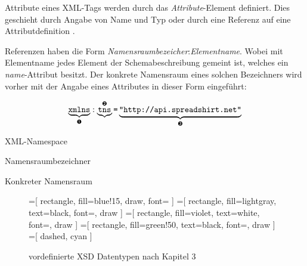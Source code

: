 Attribute eines \gls{XML}-Tags werden durch das \emph{Attribute}-Element definiert. Dies geschieht durch Angabe von Name und Typ  oder durch eine Referenz auf eine Attributdefinition .

Referenzen haben die Form \emph{Namensraumbezeicher}:\emph{Elementname}. Wobei mit Elementname jedes Element der Schemabeschreibung gemeint ist, welches ein \emph{name}-Attribut besitzt. Der konkrete Namensraum eines solchen Bezeichners wird vorher mit der Angabe eines Attributes in dieser Form eingeführt:

\[  
    \underbrace{\text{\texttt{xmlns}}}_{\text{\ding{202}}}
    :
    \underbrace{\text{\texttt{tns}}}^{\text{\ding{203}}}
    \texttt{=}
    \underbrace{
        \texttt{"http://api.spreadshirt.net"}
    }_{\text{\ding{204}}}
\]

\begin{compactitem}
    \item[\ding{202}] \gls{XML}-Namespace
    \item[\ding{203}] Namensraumbezeichner
    \item[\ding{204}] Konkreter Namensraum
\end{compactitem}

%
%

\begin{sidewaysfigure}
    \centering
    =[
        rectangle,
        fill={blue!15},
        draw,
        font=\sffamily
    ]      
    =[
        rectangle,
        fill=lightgray,
        text=black,
        font=\sffamily,
        draw
    ]
    =[
        rectangle,
        fill=violet,
        text=white,
        font=\sffamily,
        draw
    ]
    =[
        rectangle,
        fill=green!50,
        text=black,
        font=\sffamily,
        draw
    ]
    =[
        dashed,
        cyan
    ]
    \resizebox{\textheight}{!}{
            
    }
    \vspace{\baselineskip}\\
    \resizebox{0.5\textheight}{!}{
            
    }        
    \caption{vordefinierte \gls{XSD} Datentypen nach \cite{XMLSchema11Specification} Kapitel 3}
    \label{fig:xsddatatypes}
\end{sidewaysfigure}